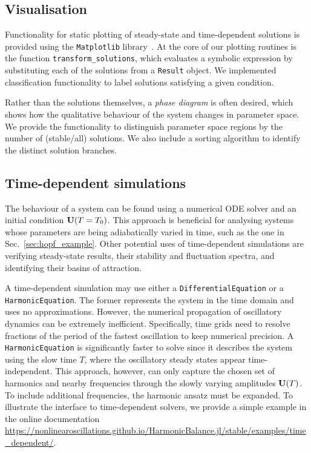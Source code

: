 \subsection{Visualisation}\label{subsec:vis}

Functionality for static plotting of steady-state and time-dependent solutions is provided using the \texttt{Matplotlib} library~\cite{Hunter2007}. At the core of our plotting routines is the function \texttt{transform\_solutions}, which evaluates a symbolic expression by substituting each of the solutions from a \texttt{Result} object. We implemented classification functionality to label solutions satisfying a given condition.

Rather than the solutions themselves, a \textit{phase diagram} is often desired, which shows how the qualitative behaviour of the system changes in parameter space. We provide the functionality to distinguish parameter space regions by the number of (stable/all) solutions. We also include a sorting algorithm to identify the distinct solution branches.

\subsection{Time-dependent simulations}\label{sec:time_dep}

The behaviour of a system can be found using a numerical ODE solver and an initial condition $\vb{U}(T=T_0)$. This approach is beneficial for analysing systems whose parameters are being adiabatically varied in time, such as the one in Sec.~\ref{sec:hopf_example}. Other potential uses of time-dependent simulations are verifying steady-state results, their stability and fluctuation spectra, and identifying their basins of attraction.

A time-dependent simulation may use either a \texttt{DifferentialEquation} or a \texttt{HarmonicEquation}. The former represents the system in the time domain and uses no approximations. However, the numerical propagation of oscillatory dynamics can be extremely inefficient. Specifically, time grids need to resolve fractions of the period of the fastest oscillation to keep numerical precision. A \texttt{HarmonicEquation} is significantly faster to solve since it describes the system using the slow time $T$, where the oscillatory steady states appear time-independent. This approach, however, can only capture the chosen set of harmonics and nearby frequencies through the slowly varying amplitudes $\vb{U}(T)$. To include additional frequencies, the harmonic ansatz must be expanded. To illustrate the interface to time-dependent solvers, we provide a simple example in the online documentation \url{https://nonlinearoscillations.github.io/HarmonicBalance.jl/stable/examples/time_dependent/}.

